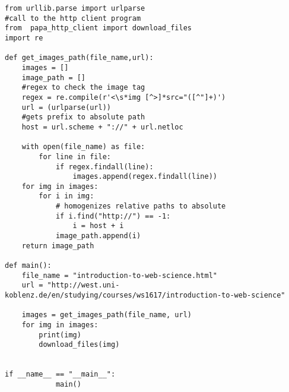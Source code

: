\documentclass{WeSTassignment}
\begin{document}
\begin{lstlisting}
from urllib.parse import urlparse
#call to the http client program
from  papa_http_client import download_files
import re

def get_images_path(file_name,url):
    images = []
    image_path = []
    #regex to check the image tag
    regex = re.compile(r'<\s*img [^>]*src="([^"]+)')
    url = (urlparse(url))
    #gets prefix to absolute path
    host = url.scheme + "://" + url.netloc

    with open(file_name) as file:
        for line in file:
            if regex.findall(line):
                images.append(regex.findall(line))
    for img in images:
        for i in img:
            # homogenizes relative paths to absolute
            if i.find("http://") == -1:
                i = host + i
            image_path.append(i)
    return image_path

def main():
    file_name = "introduction-to-web-science.html"
    url = "http://west.uni-koblenz.de/en/studying/courses/ws1617/introduction-to-web-science"

    images = get_images_path(file_name, url)
    for img in images:
        print(img)
        download_files(img)


if __name__ == "__main__":
            main()

\end{lstlisting}








\makefooter
\end{document}
